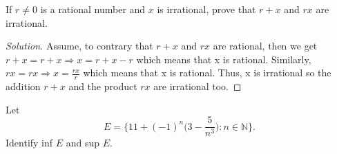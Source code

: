 \documentclass[12pt]{article}
\newenvironment{exercise}[2][Exercise]{\begin{trivlist}
\item[\hskip \labelsep {\bfseries #1}\hskip \labelsep {\bfseries #2.}]}{\end{trivlist}}
\newenvironment{solution}{\begin{proof}[Solution]}{\end{proof}}
\begin{document}
\begin{exercise}{4} %
If $r \neq 0$ is a rational number and $x$ is irrational, prove that $r+x$ and $rx$ are irrational.
\end{exercise}
\begin{solution}
Assume, to contrary that $r+x$ and $rx$ are rational, then we get $r+x=r+x \Rightarrow x=r+x-r$ which means that x is rational. Similarly, $rx=rx \Rightarrow x=\frac{rx}{r}$ which means that x is rational. Thus, x is irrational so the addition $r+x $ and the product $rx$ are irrational too.
\end{solution}

\begin{exercise}{5} %
Let
\begin{equation}
E=\{ 11+(-1)^n \Big(3-\frac{5}{n^3} \Big):n \in \mathbb{N} \}.
\end{equation}
Identify inf $E$ and sup $E$.
\end{exercise}
\end{document}
